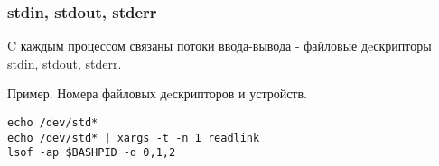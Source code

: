 \begin{frame}[fragile]
	\frametitle{stdin, stdout, stderr}
     C каждым процессом связаны потоки ввода-вывода - файловые дeскрипторы stdin, stdout, stderr.
    \begin{block}{Пример. Номера файловых дeскрипторов и устройств. }
\begin{lstlisting}
echo /dev/std*
echo /dev/std* | xargs -t -n 1 readlink
lsof -ap $BASHPID -d 0,1,2
\end{lstlisting}
    \end{block}
\end{frame}

